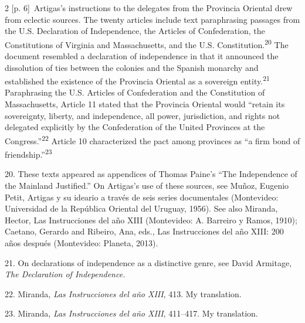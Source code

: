 \documentclass[10pt,a4paper]{article}
\begin{document}
\begin{paracol}{2}
{\scriptsize\color{gray} [p. 6]}\ Artigas’s instructions to the delegates from the Provincia Oriental drew from eclectic sources. The twenty articles include text paraphrasing passages from the U.S. Declaration of Independence, the Articles of Confederation, the Constitutions of Virginia and Massachusetts, and the U.S. Constitution.\nobreak\textsuperscript{20} The document resembled a declaration of independence in that it announced the dissolution of ties between the colonies and the Spanish monarchy and established the existence of the Provincia Oriental as a sovereign entity.\nobreak\textsuperscript{21} Paraphrasing the U.S. Articles of Confederation and the Constitution of Massachusetts, Article 11 stated that the Provincia Oriental would “retain its sovereignty, liberty, and independence, all power, jurisdiction, and rights not delegated explicitly by the Confederation of the United Provinces at the Congress.”\nobreak\textsuperscript{22} Article 10 characterized the pact among provinces as “a firm bond of friendship.”\nobreak\textsuperscript{23}\par{\small 20. These texts appeared as appendices of Thomas Paine’s “The Independence of the Mainland Justified.” On Artigas’s use of these sources, see Muñoz, Eugenio Petit, Artigas y su ideario a través de seis series documentales (Montevideo: Universidad de la República Oriental del Uruguay, 1956). See also Miranda, Hector, Las Instrucciones del año XIII (Montevideo: A. Barreiro y Ramos, 1910); Caetano, Gerardo and Ribeiro, Ana, eds., Las Instrucciones del año XIII: 200 años después (Montevideo: Planeta, 2013).\par}{\small 21. On declarations of independence as a distinctive genre, see David Armitage, \textit{The Declaration of Independence.}\par}{\small 22. Miranda, \textit{Las Instrucciones del año XIII}, 413. My translation.\par}{\small 23. Miranda, \textit{Las Instrucciones del año XIII}, 411–417. My translation.\par}
\switchcolumn*

\end{paracol}
\end{document}
